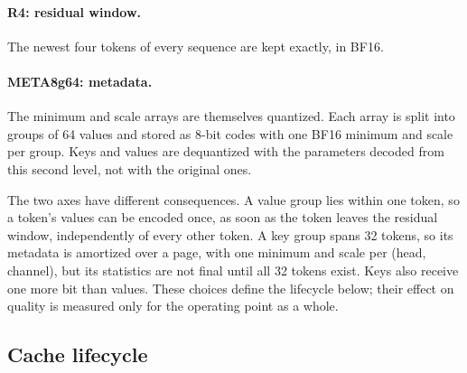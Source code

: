 \documentclass{article}
\begin{document}
\paragraph{R4: residual window.}
The newest four tokens of every sequence are kept exactly, in BF16.

\paragraph{META8g64: metadata.}
The minimum and scale arrays are themselves quantized. Each array is split into groups of 64 values and
stored as 8-bit codes with one BF16 minimum and scale per group. Keys and values are dequantized with
the parameters decoded from this second level, not with the original ones.

The two axes have different consequences. A value group lies within one token, so a token's values can
be encoded once, as soon as the token leaves the residual window, independently of every other token.
A key group spans 32 tokens, so its metadata is amortized over a page, with one minimum and scale per
(head, channel), but its statistics are not final until all 32 tokens exist. Keys also receive one more
bit than values. These choices define the lifecycle below; their effect on quality is measured only for
the operating point as a whole.

\subsection{Cache lifecycle}
\end{document}
